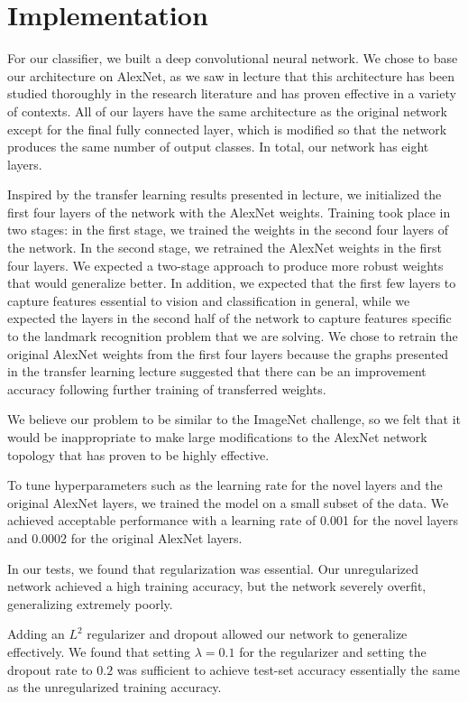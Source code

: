 \section{Implementation}
For our classifier, we built a deep convolutional neural network. We chose to base our architecture on AlexNet, as we saw in lecture that this architecture has been studied thoroughly in the research literature and has proven effective in a variety of contexts. All of our layers have the same architecture as the original network except for the final fully connected layer, which is modified so that the network produces the same number of output classes. In total, our network has eight layers.

Inspired by the transfer learning results presented in lecture, we initialized the first four layers of the network with the AlexNet weights. Training took place in two stages: in the first stage, we trained the weights in the second four layers of the network. In the second stage, we retrained the AlexNet weights in the first four layers. We expected a two-stage approach to produce more robust weights that would generalize better. In addition, we expected that the first few layers to capture features essential to vision and classification in general, while we expected the layers in the second half of the network to capture features specific to the landmark recognition problem that we are solving. We chose to retrain the original AlexNet weights from the first four layers because the graphs presented in the transfer learning lecture suggested that there can be an improvement accuracy following further training of transferred weights.

We believe our problem to be similar to the ImageNet challenge, so we felt that it would be inappropriate to make large modifications to the AlexNet network topology that has proven to be highly effective.

To tune hyperparameters such as the learning rate for the novel layers and the original AlexNet layers, we trained the model on a small subset of the data. We achieved acceptable performance with a learning rate of 0.001 for the novel layers and 0.0002 for the original AlexNet layers.

In our tests, we found that regularization was essential. Our unregularized network achieved a high training accuracy, but the network severely overfit, generalizing extremely poorly.

Adding an $L^2$ regularizer and dropout allowed our network to generalize effectively. We found that setting $\lambda = 0.1$ for the regularizer and setting the dropout rate to $0.2$ was sufficient to achieve test-set accuracy essentially the same as the unregularized training accuracy.